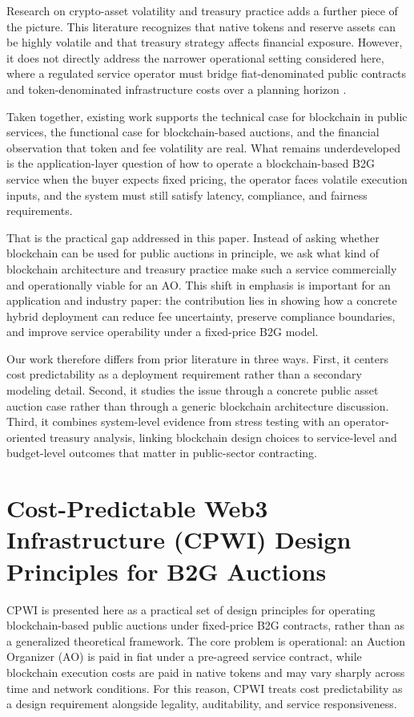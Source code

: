 \documentclass[runningheads]{llncs}
\begin{document}
Research on crypto-asset volatility and treasury practice adds a further piece of the picture. This literature recognizes that native tokens and reserve assets can be highly volatile and that treasury strategy affects financial exposure. However, it does not directly address the narrower operational setting considered here, where a regulated service operator must bridge fiat-denominated public contracts and token-denominated infrastructure costs over a planning horizon \cite{shi2025,wen2025,jotaki2024,guennoun2025}.

Taken together, existing work supports the technical case for blockchain in public services, the functional case for blockchain-based auctions, and the financial observation that token and fee volatility are real. What remains underdeveloped is the application-layer question of how to operate a blockchain-based B2G service when the buyer expects fixed pricing, the operator faces volatile execution inputs, and the system must still satisfy latency, compliance, and fairness requirements.

That is the practical gap addressed in this paper. Instead of asking whether blockchain can be used for public auctions in principle, we ask what kind of blockchain architecture and treasury practice make such a service commercially and operationally viable for an AO. This shift in emphasis is important for an application and industry paper: the contribution lies in showing how a concrete hybrid deployment can reduce fee uncertainty, preserve compliance boundaries, and improve service operability under a fixed-price B2G model.

Our work therefore differs from prior literature in three ways. First, it centers cost predictability as a deployment requirement rather than a secondary modeling detail. Second, it studies the issue through a concrete public asset auction case rather than through a generic blockchain architecture discussion. Third, it combines system-level evidence from stress testing with an operator-oriented treasury analysis, linking blockchain design choices to service-level and budget-level outcomes that matter in public-sector contracting.

\section{Cost-Predictable Web3 Infrastructure (CPWI) Design Principles for B2G Auctions}

CPWI is presented here as a practical set of design principles for operating
blockchain-based public auctions under fixed-price B2G contracts, rather than as
a generalized theoretical framework. The core problem is operational: an Auction Organizer
(AO) is paid in fiat under a pre-agreed service contract, while blockchain
execution costs are paid in native tokens and may vary sharply across time and
network conditions. For this reason, CPWI treats cost predictability as a design
requirement alongside legality, auditability, and service responsiveness.
\end{document}
